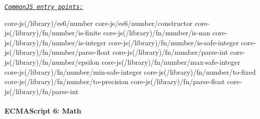  \href{#commonjs}{\tt {\itshape Common\+JS entry points\+:}} 
\begin{DoxyCode}
core-js(/library)/es6/number
core-js/es6/number/constructor
core-js(/library)/fn/number/is-finite
core-js(/library)/fn/number/is-nan
core-js(/library)/fn/number/is-integer
core-js(/library)/fn/number/is-safe-integer
core-js(/library)/fn/number/parse-float
core-js(/library)/fn/number/parse-int
core-js(/library)/fn/number/epsilon
core-js(/library)/fn/number/max-safe-integer
core-js(/library)/fn/number/min-safe-integer
core-js(/library)/fn/number/to-fixed
core-js(/library)/fn/number/to-precision
core-js(/library)/fn/parse-float
core-js(/library)/fn/parse-int
\end{DoxyCode}
 \paragraph*{E\+C\+M\+A\+Script 6\+: Math}

